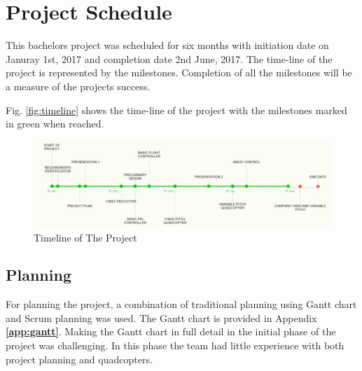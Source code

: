 \chapter{Project Schedule}


This bachelors project was scheduled for six months with initiation date on Januray 1st, 2017 and completion date 2nd June, 2017. The time-line of the project is represented by the milestones. Completion of all the milestones will be a measure of the projects success. \bigskip

Fig. \ref{fig:timeline} shows the time-line of the project with the milestones marked in green when reached. 

\begin{figure}[H]
          \centering
            \includegraphics[scale = 0.6]{VAPIQ-PICTURES/Timeline}
                \caption{Timeline of The Project}
                \label{fig:timeline}
            \label{dir}
\end{figure}    


\section{Planning}

For planning the project, a combination of traditional planning using Gantt chart and Scrum planning was used. The Gantt chart is provided in Appendix \textbf{\ref{app:gantt}}. Making the Gantt chart in full detail in the initial phase of the project was challenging. In this phase the team had little experience with both project planning and quadcopters. \bigskip

